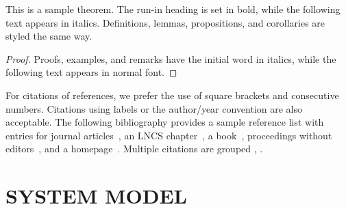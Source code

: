 \documentclass[runningheads]{llncs}
\begin{document}
\begin{theorem}
This is a sample theorem. The run-in heading is set in bold, while
the following text appears in italics. Definitions, lemmas,
propositions, and corollaries are styled the same way.
\end{theorem}
%
%
\begin{proof}
Proofs, examples, and remarks have the initial word in italics,
while the following text appears in normal font.
\end{proof}
For citations of references, we prefer the use of square brackets
and consecutive numbers. Citations using labels or the author/year
convention are also acceptable. The following bibliography provides
a sample reference list with entries for journal
articles~\cite{ref_article1}, an LNCS chapter~\cite{ref_lncs1}, a
book~\cite{ref_book1}, proceedings without editors~\cite{ref_proc1},
and a homepage~\cite{ref_url1}. Multiple citations are grouped
\cite{ref_article1,ref_lncs1,ref_book1},
\cite{ref_article1,ref_book1,ref_proc1,ref_url1}.
\section{SYSTEM MODEL}
\end{document}
